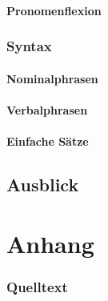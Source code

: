 \documentclass[12pt,abstract=on,titlepage,bibliography=totoc,ngerman,listof=totoc]{scrreprt}
\begin{document}
\subsection{Pronomenflexion}
\label{subsec:pronomen}
\pagebreak
\section{Syntax}
\label{sec:syntax}
\subsection{Nominalphrasen}
\label{subsec:nominalphrasen}
\subsection{Verbalphrasen}
\label{subsec:verbalphrasen}
\subsection{Einfache Sätze}
\label{subsec:einfachesaetze}
\pagebreak
\chapter{Ausblick}
\label{chap:ausblick}
\pagebreak
\clearpage
{}
\setcounter{page}{1}
%
\printbibliography
\pagebreak

\part{Anhang}
\label{part:anhang}
\section{Quelltext}
\label{sec:quelltext}
%
\end{document}
